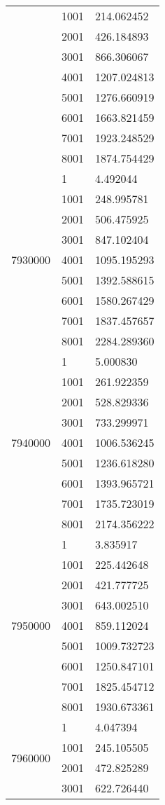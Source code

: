 \begin{table}[htb!]
\begin{tabular}{lll}
 & 1001 & 214.062452 \\
 & 2001 & 426.184893 \\
 & 3001 & 866.306067 \\
 & 4001 & 1207.024813 \\
 & 5001 & 1276.660919 \\
 & 6001 & 1663.821459 \\
 & 7001 & 1923.248529 \\
 & 8001 & 1874.754429 \\
\multirow[c]{9}{*}{7930000} & 1 & 4.492044 \\
 & 1001 & 248.995781 \\
 & 2001 & 506.475925 \\
 & 3001 & 847.102404 \\
 & 4001 & 1095.195293 \\
 & 5001 & 1392.588615 \\
 & 6001 & 1580.267429 \\
 & 7001 & 1837.457657 \\
 & 8001 & 2284.289360 \\
\multirow[c]{9}{*}{7940000} & 1 & 5.000830 \\
 & 1001 & 261.922359 \\
 & 2001 & 528.829336 \\
 & 3001 & 733.299971 \\
 & 4001 & 1006.536245 \\
 & 5001 & 1236.618280 \\
 & 6001 & 1393.965721 \\
 & 7001 & 1735.723019 \\
 & 8001 & 2174.356222 \\
\multirow[c]{9}{*}{7950000} & 1 & 3.835917 \\
 & 1001 & 225.442648 \\
 & 2001 & 421.777725 \\
 & 3001 & 643.002510 \\
 & 4001 & 859.112024 \\
 & 5001 & 1009.732723 \\
 & 6001 & 1250.847101 \\
 & 7001 & 1825.454712 \\
 & 8001 & 1930.673361 \\
\multirow[c]{9}{*}{7960000} & 1 & 4.047394 \\
 & 1001 & 245.105505 \\
 & 2001 & 472.825289 \\
 & 3001 & 622.726440 \\

\end{tabular}
\end{table}
